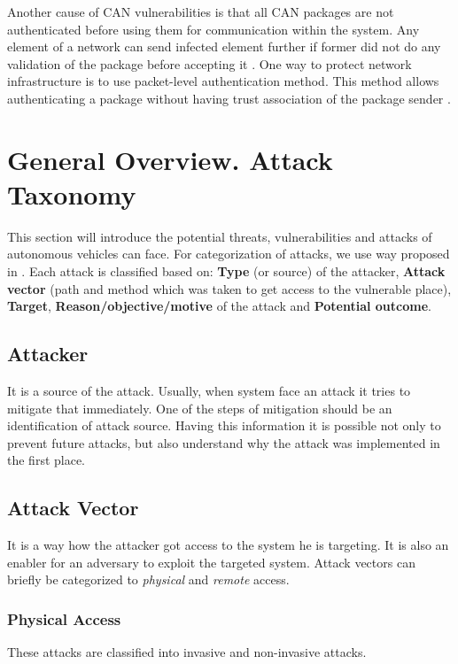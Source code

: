 \begin{enumerate}
	Another cause of \gls{CAN} vulnerabilities is that all \gls{CAN} packages are not authenticated before using them for communication within the system. Any element of a network can send infected element further if former did not do any validation of the package before accepting it \cite{secanalysis}.
	One way to protect network infrastructure is to use packet-level authentication method. This method allows authenticating a package without having trust association of the package sender \cite{pla}.
\end{enumerate}

\section{General Overview. Attack Taxonomy}

This section will introduce the potential threats, vulnerabilities
and attacks of autonomous vehicles can face. For categorization of attacks, we use way proposed in \cite{sec}. Each attack is classified based on: \textbf{Type} (or source) of the attacker, \textbf{Attack vector} (path and method which was taken to get access to the vulnerable place), \textbf{Target}, \textbf{Reason/objective/motive} of the attack and \textbf{Potential outcome}.

\subsection{Attacker}

It is a source of the attack. Usually, when system face an attack it tries to mitigate that immediately. One of the steps of mitigation should be an identification of attack source. Having this information it is possible not only to prevent future attacks, but also understand why the attack was implemented in the first place.
	
\subsection{Attack Vector}
It is a way how the attacker got access to the system he is targeting. It is also an enabler for an adversary to exploit the targeted system. Attack vectors can briefly be categorized to \textit{physical} and \textit{remote} access.

\subsubsection{Physical Access}
These attacks are classified into invasive and non-invasive attacks.

